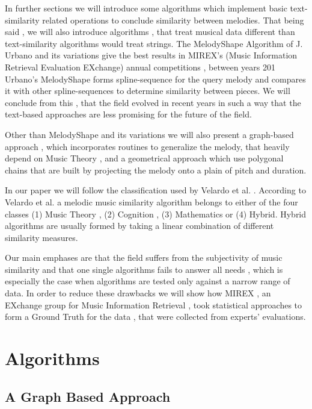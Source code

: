 \documentclass{llncs}
\begin{document}
		In further sections we will introduce some algorithms which implement basic text-similarity related operations to conclude similarity between melodies. That being said , we will also introduce  algorithms , that treat musical data different than text-similarity algorithms would treat  strings. The MelodyShape Algorithm of J. Urbano \cite{five_point_two}  and its variations give the best results in MIREX's (Music Information Retrieval Evaluation EXchange) annual competitions , between years 201
		Urbano's MelodyShape forms spline-sequence for the query melody and compares it with other spline-sequences to determine similarity between pieces. We will conclude from this , that the field evolved in recent years in such a way that the text-based approaches are less promising for the future of the field.

		Other than MelodyShape and its variations we will also present a graph-based approach \cite{two_point_four} , which incorporates routines to generalize the melody, that heavily depend on Music Theory , and a geometrical approach which use polygonal chains that are built by projecting the melody onto a plain of pitch and duration.

		In our paper we will follow the classification used by Velardo et al. \cite{two}. According to Velardo et al. a melodic music similarity algorithm belongs to either of the four classes (1) Music Theory , (2) Cognition , (3) Mathematics or (4) Hybrid. Hybrid algorithms are usually formed by taking a linear combination of different similarity measures. 

		Our main emphases are that the field suffers from the subjectivity of music similarity and that one single algorithms fails to answer all needs , which is especially the case when algorithms are tested only against a narrow range of data. In order to reduce these drawbacks we will show how MIREX , an EXchange group for Music Information Retrieval , took statistical approaches to form a Ground Truth for the data , that were collected from experts' evaluations. 
	
	\section{Algorithms}

		\subsection{A Graph Based Approach}
\end{document}
